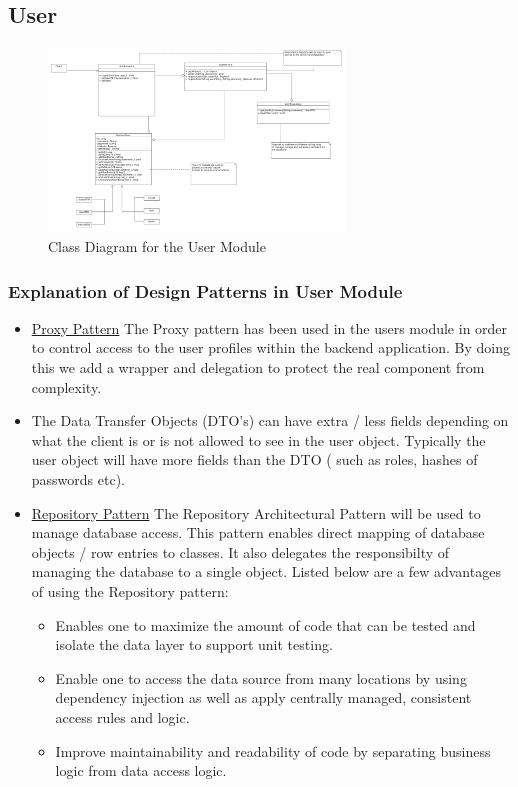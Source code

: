 \documentclass[runningheads,a4paper]{article}
\begin{document}
\subsection {User}

\begin{figure}[H]
   	\centering
   	\includegraphics[width=0.7\textwidth]{User_Class_Diagrams.png}
   	\caption{Class Diagram for the User Module}
\end{figure}
\subsubsection {Explanation of Design Patterns in User Module}
\begin{itemize}
\item \underline{Proxy Pattern} The Proxy pattern has been used in the users module in order to control access to the user profiles within the backend application. By doing this we add a wrapper and delegation to protect the real component from complexity. 

\item The Data Transfer Objects (DTO's)  can have extra / less fields depending on what the client is or is not allowed to see in the user object. Typically the user object will have more fields than the DTO ( such as roles, hashes of passwords etc). 

\item \underline{Repository Pattern} The Repository Architectural Pattern will be used to manage database access. This pattern enables direct mapping of database objects / row entries to classes. It also delegates the responsibilty of managing the database to a single object. Listed below are a few advantages of using the Repository pattern:
	\begin{itemize}
		\item Enables one to maximize the amount of code that can be tested and isolate the data layer to support unit testing. 
		\item Enable one to access the data source from many locations by using dependency injection as well as apply centrally managed, consistent access rules and logic.
		\item Improve maintainability and readability of code by separating business logic from data access logic.  
	\end{itemize}

 
\end{itemize}
\end{document}
